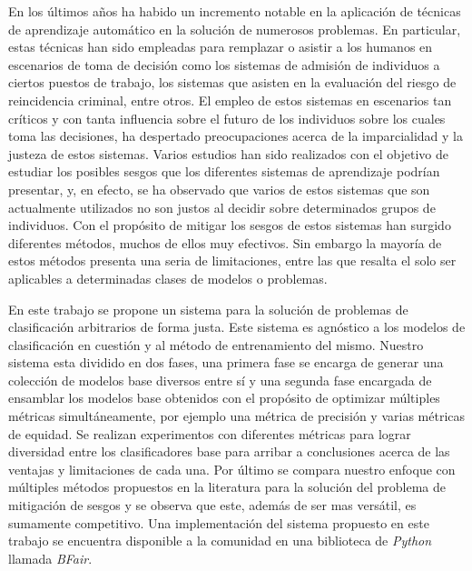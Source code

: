 \begin{resumen}

En los últimos años ha habido un incremento notable en la aplicación de técnicas de aprendizaje automático en la solución de numerosos problemas.
En particular, estas técnicas han sido empleadas para remplazar o asistir a los humanos en escenarios de toma de decisión como los sistemas de admisión de individuos a ciertos puestos de trabajo, los sistemas que asisten en la evaluación del riesgo de reincidencia criminal, entre otros.
El empleo de estos sistemas en escenarios tan críticos y con tanta influencia sobre el futuro de los individuos sobre los cuales toma las decisiones, ha despertado preocupaciones acerca de la imparcialidad y la justeza de estos sistemas.
Varios estudios han sido realizados con el objetivo de estudiar los posibles sesgos que los diferentes sistemas de aprendizaje podrían presentar, y, en efecto, se ha observado que varios de estos sistemas que son actualmente utilizados no son justos al decidir sobre determinados grupos de individuos.
Con el propósito de mitigar los sesgos de estos sistemas han surgido diferentes métodos, muchos de ellos muy efectivos.
Sin embargo la mayoría de estos métodos presenta una seria de limitaciones, entre las que resalta el solo ser aplicables a determinadas clases de modelos o problemas.

En este trabajo se propone un sistema para la solución de problemas de clasificación arbitrarios de forma justa.
Este sistema es agnóstico a los modelos de clasificación en cuestión y al método de entrenamiento del mismo.
Nuestro sistema esta dividido en dos fases, una primera fase se encarga de generar una colección de modelos base diversos entre sí y una segunda fase encargada de ensamblar los modelos base obtenidos con el propósito de optimizar múltiples métricas simultáneamente, por ejemplo una métrica de precisión y varias métricas de equidad.
Se realizan experimentos con diferentes métricas para lograr diversidad entre los clasificadores base para arribar a conclusiones acerca de las ventajas y limitaciones de cada una.
Por último se compara nuestro enfoque con múltiples métodos propuestos en la literatura para la solución del problema de mitigación de sesgos y se observa que este, además de ser mas versátil, es sumamente competitivo.
Una implementación del sistema propuesto en este trabajo se encuentra disponible a la comunidad en una biblioteca de \emph{Python} llamada \emph{BFair}.

\end{resumen}

